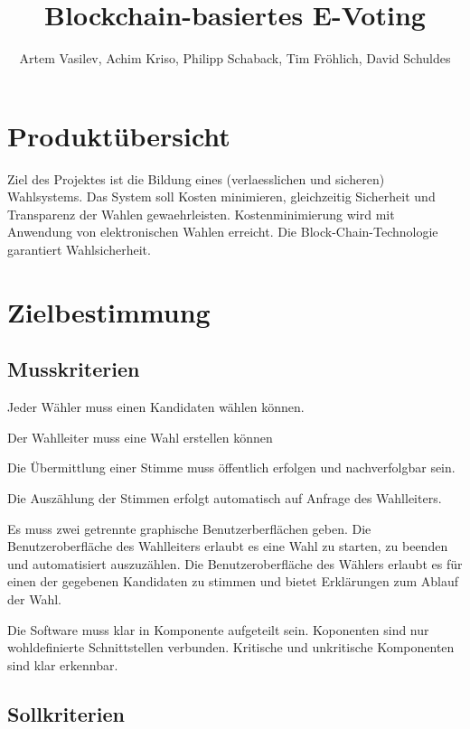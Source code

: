 \documentclass[parskip=full,11pt,twoside]{scrartcl}
\title{Blockchain-basiertes E-Voting}
\author{Artem Vasilev, Achim Kriso, Philipp Schaback, Tim Fröhlich, David Schuldes}
\begin{document}
\maketitle

\pagebreak
\section{Produktübersicht}
Ziel des Projektes ist die Bildung eines (verlaesslichen und sicheren) Wahlsystems.  Das System soll Kosten minimieren, gleichzeitig Sicherheit und Transparenz der Wahlen gewaehrleisten. Kostenminimierung wird mit Anwendung von elektronischen Wahlen erreicht. Die Block-Chain-Technologie garantiert Wahlsicherheit.
\section{Zielbestimmung}

\subsection{Musskriterien}

Jeder Wähler muss einen Kandidaten wählen können.

Der Wahlleiter muss eine Wahl erstellen können

Die Übermittlung einer Stimme muss öffentlich erfolgen und nachverfolgbar sein.

Die Auszählung der Stimmen erfolgt automatisch auf Anfrage des Wahlleiters.

Es muss zwei getrennte graphische Benutzerberflächen geben. Die Benutzeroberfläche des Wahlleiters erlaubt es eine Wahl zu starten, zu beenden und automatisiert auszuzählen. Die Benutzeroberfläche des Wählers erlaubt es für einen der gegebenen Kandidaten zu stimmen und bietet Erklärungen zum Ablauf der Wahl. 

Die Software muss klar in Komponente aufgeteilt sein. Koponenten sind nur  wohldefinierte Schnittstellen verbunden.
Kritische und unkritische Komponenten sind klar erkennbar.

\subsection{Sollkriterien}
\end{document}

